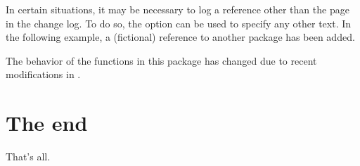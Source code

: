 \documentclass[a4paper, 11pt]{article}
\begin{document}
In certain situations, it may be necessary to log a reference other than the page in the change log. To do so, the  option can be used to specify any other text. In the following example, a (fictional) reference to another package has been added.

\begin{DocsExample}
    The behavior of the functions in this package has changed due to recent modifications in .
\end{DocsExample}

\section{The end}
That's all.
\end{document}
